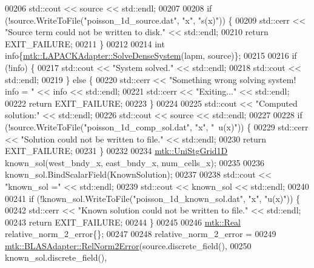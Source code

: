\begin{DoxyCode}
00206   std::cout << source << std::endl;
00207 
00208   \textcolor{keywordflow}{if} (!source.WriteToFile(\textcolor{stringliteral}{"poisson\_1d\_source.dat"}, \textcolor{stringliteral}{"x"}, \textcolor{stringliteral}{"s(x)"})) \{
00209     std::cerr << \textcolor{stringliteral}{"Source term could not be written to disk."} << std::endl;
00210     \textcolor{keywordflow}{return} EXIT\_FAILURE;
00211   \}
00212 
00214   \textcolor{keywordtype}{int} info\{\hyperlink{classmtk_1_1LAPACKAdapter_a7428bccf74fd4a4af68fb7233846da22}{mtk::LAPACKAdapter::SolveDenseSystem}(lapm, source)\};
00215 
00216   \textcolor{keywordflow}{if} (!info) \{
00217     std::cout << \textcolor{stringliteral}{"System solved."} << std::endl;
00218     std::cout << std::endl;
00219   \} \textcolor{keywordflow}{else} \{
00220     std::cerr << \textcolor{stringliteral}{"Something wrong solving system! info = "} << info << std::endl;
00221     std::cerr << \textcolor{stringliteral}{"Exiting..."} << std::endl;
00222     \textcolor{keywordflow}{return} EXIT\_FAILURE;
00223   \}
00224 
00225   std::cout << \textcolor{stringliteral}{"Computed solution:"} << std::endl;
00226   std::cout << source << std::endl;
00227 
00228   \textcolor{keywordflow}{if} (!source.WriteToFile(\textcolor{stringliteral}{"poisson\_1d\_comp\_sol.dat"}, \textcolor{stringliteral}{"x"}, \textcolor{stringliteral}{"~u(x)"})) \{
00229     std::cerr << \textcolor{stringliteral}{"Solution could not be written to file."} << std::endl;
00230     \textcolor{keywordflow}{return} EXIT\_FAILURE;
00231   \}
00232 
00234   \hyperlink{classmtk_1_1UniStgGrid1D}{mtk::UniStgGrid1D} known\_sol(west\_bndy\_x, east\_bndy\_x, num\_cells\_x);
00235 
00236   known\_sol.BindScalarField(KnownSolution);
00237 
00238   std::cout << \textcolor{stringliteral}{"known\_sol ="} << std::endl;
00239   std::cout << known\_sol << std::endl;
00240 
00241   \textcolor{keywordflow}{if} (!known\_sol.WriteToFile(\textcolor{stringliteral}{"poisson\_1d\_known\_sol.dat"}, \textcolor{stringliteral}{"x"}, \textcolor{stringliteral}{"u(x)"})) \{
00242     std::cerr << \textcolor{stringliteral}{"Known solution could not be written to file."} << std::endl;
00243     \textcolor{keywordflow}{return} EXIT\_FAILURE;
00244   \}
00245 
00246   \hyperlink{group__c01-roots_gac080bbbf5cbb5502c9f00405f894857d}{mtk::Real} relative\_norm\_2\_error\{\};
00247 
00248   relative\_norm\_2\_error =
00249     \hyperlink{classmtk_1_1BLASAdapter_af2ac5691f45e67d6e26186b071119ec4}{mtk::BLASAdapter::RelNorm2Error}(source.discrete\_field(),
00250                                     known\_sol.discrete\_field(),

\end{DoxyCode}

